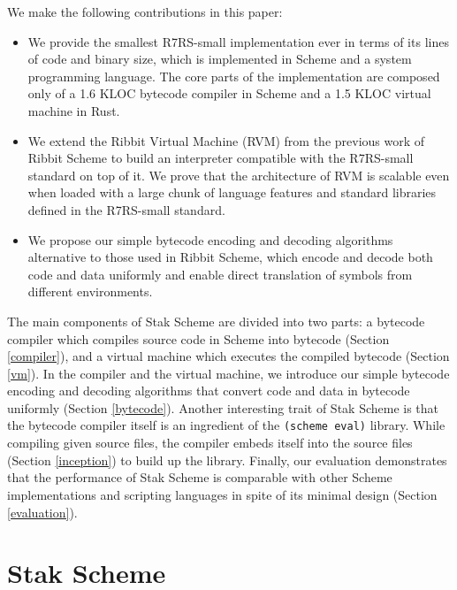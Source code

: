\documentclass[sigplan]{acmart}
\begin{document}
We make the following contributions in this paper:

\begin{itemize}
  \item We provide the smallest R7RS-small implementation ever in
    terms of its lines of code and binary size, which is implemented
    in Scheme and a system programming language.
    The core parts of the implementation are composed only of a 1.6 KLOC
    bytecode compiler in Scheme and a 1.5 KLOC virtual machine in Rust.
  \item We extend the Ribbit Virtual Machine (RVM) from the previous
    work of Ribbit Scheme to build an interpreter compatible with the
    R7RS-small standard on top of it.
    We prove that the architecture of RVM is scalable even when
    loaded with a large chunk of language features and standard
    libraries defined in the R7RS-small standard.
  \item We propose our simple bytecode encoding and decoding algorithms
    alternative to those used in Ribbit Scheme, which encode and
    decode both code and data uniformly and enable direct translation
    of symbols from different environments.
\end{itemize}

The main components of Stak Scheme are divided into two parts:
a bytecode compiler which compiles source code in Scheme into
bytecode (Section \ref{compiler}),
and a virtual machine which executes the compiled bytecode
(Section \ref{vm}).
In the compiler and the virtual machine, we introduce our simple
bytecode encoding and
decoding algorithms that convert code and data in bytecode
uniformly (Section \ref{bytecode}).
Another interesting trait of Stak Scheme is that the bytecode compiler itself
is an ingredient of the \texttt{(scheme eval)} library.
While compiling given source files, the compiler embeds itself
into the source files (Section \ref{inception}) to build up the library.
Finally, our evaluation demonstrates that the performance of Stak Scheme is
comparable with other Scheme implementations and scripting
languages in spite of its minimal design (Section \ref{evaluation}).

\section{Stak Scheme}
\end{document}
